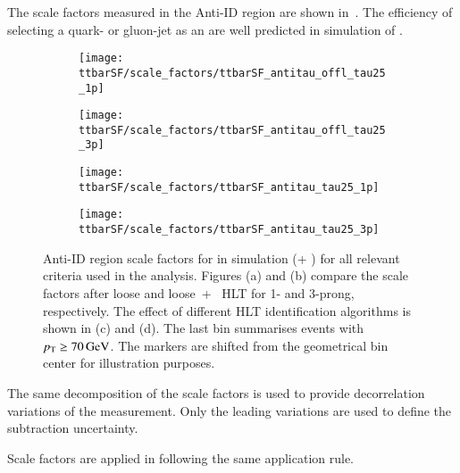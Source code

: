 The scale factors measured in the Anti-ID region are shown
in~. The efficiency of selecting a quark-
or gluon-jet as an \antitau are well predicted in simulation of
\ttbar.

\begin{figure}[htbp]
  \centering

  \begin{subfigure}[t]{.495\textwidth}
    \texttt{[image: ttbarSF/scale\_factors/ttbarSF\_antitau\_offl\_tau25\_1p]}
    \caption{}
    \label{fig:ttbarSF_antiid_SF_a}
  \end{subfigure}\hfill%
  \begin{subfigure}[t]{.495\textwidth}
    \texttt{[image: ttbarSF/scale\_factors/ttbarSF\_antitau\_offl\_tau25\_3p]}
    \caption{}
    \label{fig:ttbarSF_antiid_SF_b}
  \end{subfigure}

  \begin{subfigure}[t]{.495\textwidth}
    \texttt{[image: ttbarSF/scale\_factors/ttbarSF\_antitau\_tau25\_1p]}
    \caption{}
    \label{fig:ttbarSF_antiid_SF_c}
  \end{subfigure}\hfill%
  \begin{subfigure}[t]{.495\textwidth}
    \texttt{[image: ttbarSF/scale\_factors/ttbarSF\_antitau\_tau25\_3p]}
    \caption{}
    \label{fig:ttbarSF_antiid_SF_d}
  \end{subfigure}

  \caption{Anti-ID region scale factors for \faketauhadvis in \ttbar
    simulation (\POWHEGBOX[v2] + \PYTHIA[8]) for all relevant \tauid
    criteria used in the analysis. Figures (a) and (b) compare the
    scale factors after loose and loose~+~ HLT \tauid for 1- and
    3-prong, respectively. The effect of different HLT identification
    algorithms is shown in (c) and (d). The last bin summarises events
    with \tauhadvis~$\pT \geq \SI{70}{\GeV}$. The markers are shifted from
    the geometrical bin center for illustration purposes.}
  \label{fig:ttbarSF_antiid_SF}
\end{figure}

The same decomposition of the scale factors is used to provide
decorrelation variations of the measurement. Only the leading
variations are used to define the subtraction uncertainty.

Scale factors are applied in \hadhad following the same application
rule.




